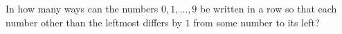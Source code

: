 In how many ways can the numbers $0,1,\dots,9$ be written in a row so that each number other than the leftmost differs by $1$ from some number to its left?
